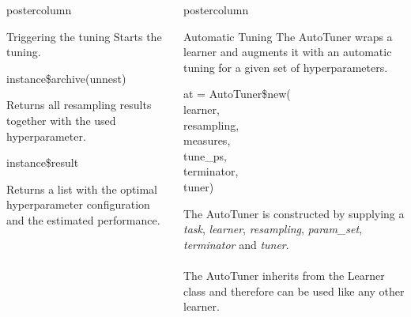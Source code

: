 \documentclass{beamer}
\newlength{\columnheight} %
\begin{document}
\begin{frame}[fragile]{}
\begin{columns}
\begin{column}{.245\textwidth}
\begin{beamercolorbox}[center]{postercolumn}
\begin{minipage}{.98\textwidth}
{\begin{myblock}{Triggering the tuning}
							Starts the tuning.
							\\
							\begin{codebox}
								instance\$archive(unnest)
							\end{codebox}
							Returns all resampling results together with the used hyperparameter.
							\\
							\begin{codebox}
								instance\$result
							\end{codebox}
							Returns a list with the optimal hyperparameter configuration and the estimated performance.
						\end{myblock}
					\vfill}
				\end{minipage}
			\end{beamercolorbox}
		\end{column}
		\begin{column}{.245\textwidth}
			\begin{beamercolorbox}[center]{postercolumn}
				\begin{minipage}{.98\textwidth}
					\parbox[t][\columnheight]{\textwidth}{
						\begin{myblock}{Automatic Tuning}
						The AutoTuner wraps a learner and augments it with an automatic tuning for a given set of hyperparameters. 
						\\
						\begin{codeboxmultiline}[width=18cm]
							at = AutoTuner\$new(
\\
							\hspace*{1ex}learner,
\\
							\hspace*{1ex}resampling,
\\
							\hspace*{1ex}measures,
\\
							\hspace*{1ex}tune\_ps,
\\
							\hspace*{1ex}terminator,
\\
							\hspace*{1ex}tuner)
						\end{codeboxmultiline}
						The AutoTuner is constructed by supplying a \textit{task}, \textit{learner}, \textit{resampling}, \textit{param\_set}, \textit{terminator} and \textit{tuner}. 
						\\
						\\
						The AutoTuner inherits from the Learner class and therefore can be used like any other learner.

\end{myblock}}
\end{minipage}
\end{beamercolorbox}
\end{column}
\end{columns}
\end{frame}
\end{document}
